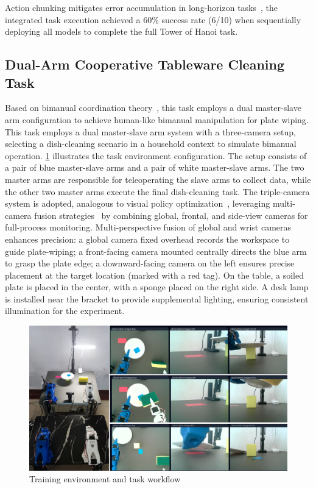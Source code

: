 \documentclass[runningheads]{llncs}
\begin{document}
Action chunking mitigates error accumulation in long-horizon tasks~\cite{ref10}, the integrated task execution achieved a 60\% success rate (6/10) when sequentially deploying all models to complete the full Tower of Hanoi task.

\subsection{Dual-Arm Cooperative Tableware Cleaning Task}
Based on bimanual coordination theory~\cite{ref11}, this task employs a dual master-slave arm configuration to achieve human-like bimanual manipulation for plate wiping. This task employs a dual master-slave arm system with a three-camera setup, selecting a dish-cleaning scenario in a household context to simulate bimanual operation. \cref{fig9} illustrates the task environment configuration. The setup consists of a pair of blue master-slave arms and a pair of white master-slave arms. The two master arms are responsible for teleoperating the slave arms to collect data, while the other two master arms execute the final dish-cleaning task. The triple-camera system is adopted, analogous to visual policy optimization~\cite{ref12}, leveraging multi-camera fusion strategies~\cite{ref13} by combining global, frontal, and side-view cameras for full-process monitoring. Multi-perspective fusion of global and wrist cameras enhances precision: a global camera fixed overhead records the workspace to guide plate-wiping; a front-facing camera mounted centrally directs the blue arm to grasp the plate edge; a downward-facing camera on the left ensures precise placement at the target location (marked with a red tag). On the table, a soiled plate is placed in the center, with a sponge placed on the right side. A desk lamp is installed near the bracket to provide supplemental lighting, ensuring consistent illumination for the experiment.

\begin{figure}[H]
\centering
\includegraphics[width=\textwidth]{fig9.pdf}
\caption{ Training environment and task workflow} \label{fig9}
\end{figure}
\end{document}
